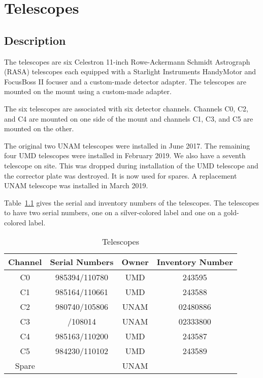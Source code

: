 \chapter{Telescopes}
\label{chapter:telescopes}

\section{Description}

The {\projectname} telescopes are six Celestron 11-inch Rowe-Ackermann Schmidt Astrograph (RASA) telescopes each equipped with a Starlight Instruments HandyMotor and FocusBoss II focuser and a custom-made detector adapter. The telescopes are mounted on the mount using a custom-made adapter.

The six telescopes are associated with six detector channels. Channels C0, C2, and C4 are mounted on one side of the mount and channels C1, C3, and C5 are mounted on the other. 

The original two UNAM telescopes were installed in June 2017. The remaining four UMD telescopes were installed in February 2019. We also have a seventh telescope on site. This was dropped during installation of the UMD telescope and the corrector plate was destroyed. It is now used for spares. A replacement UNAM telescope was installed in March 2019.

Table~\ref{table:telescopes} gives the serial and inventory numbers of the telescopes. The telescopes to have two serial numbers, one on a silver-colored label and one on a gold-colored label.

\begin{table}
\caption{Telescopes}
\label{table:telescopes}
\begin{center}
\begin{tabular}{cccc}
\hline
\hline
Channel&Serial Numbers&Owner&Inventory Number\\
\hline
C0&985394/110780&UMD&\phantom{00}243595\\
C1&985164/110661&UMD&\phantom{00}243588\\
C2&980740/105806&UNAM&02480886\\
C3&\phantom{000000}/108014&UNAM&02333800\\
C4&985163/110200&UMD&\phantom{00}243587\\
C5&984230/110102&UMD&\phantom{00}243589\\
\hline
Spare&&UNAM&\\
\hline
\end{tabular}
\end{center}
\end{table}

